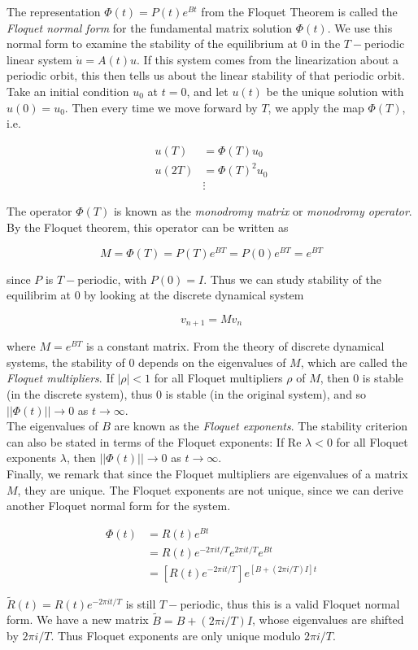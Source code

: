 \documentclass{article}
\begin{document}
The representation $\Phi(t) = P(t)e^{Bt}$ from the Floquet Theorem is called the \emph{Floquet normal form} for the fundamental matrix solution $\Phi(t)$. We use this normal form to examine the stability of the equilibrium at 0 in the $T-$periodic linear system $\dot{u} = A(t) u$. If this system comes from the linearization about a periodic orbit, this then tells us about the linear stability of that periodic orbit.\\

Take an initial condition $u_0$ at $t = 0$, and let $u(t)$ be the unique solution with $u(0) = u_0$. Then every time we move forward by $T$, we apply the map $\Phi(T)$, i.e.

\begin{align*}
u(T) &= \Phi(T) u_0 \\
u(2T) &= \Phi(T)^2 u_0 \\
&\vdots
\end{align*}

The operator $\Phi(T)$ is known as the \emph{monodromy matrix} or \emph{monodromy operator}. By the Floquet theorem, this operator can be written as

\[
M = \Phi(T) = P(T)e^{BT} = P(0) e^{BT} = e^{BT}
\]

since $P$ is $T-$periodic, with $P(0) = I$. Thus we can study stability of the equilibrim at 0 by looking at the discrete dynamical system

\[
v_{n+1} = M v_n
\]

where $M = e^{BT}$ is a constant matrix. From the theory of discrete dynamical systems, the stability of 0 depends on the eigenvalues of $M$, which are called the \emph{Floquet multipliers}. If $|\rho| < 1$ for all Floquet multipliers $\rho$ of $M$, then 0 is stable (in the discrete system), thus 0 is stable (in the original system), and so $||\Phi(t)|| \rightarrow 0$ as $t \rightarrow \infty$.\\

The eigenvalues of $B$ are known as the \emph{Floquet exponents}. The stability criterion can also be stated in terms of the Floquet exponents: If $\text{Re }\lambda < 0$ for all Floquet exponents $\lambda$, then $||\Phi(t)|| \rightarrow 0$ as $t \rightarrow \infty$.\\

Finally, we remark that since the Floquet multipliers are eigenvalues of a matrix $M$, they are unique. The Floquet exponents are not unique, since we can derive another Floquet normal form for the system.

\begin{align*}
\Phi(t) &= R(t) e^{Bt}  \\
&= R(t) e^{-2\pi i t/T}e^{2\pi i t/T}e^{Bt} \\
&= [ R(t) e^{-2\pi i t/T} ] e^{[B + (2 \pi i/T) I]t}
\end{align*}

$\tilde{R}(t) = R(t) e^{-2\pi i t/T}$ is still $T-$periodic, thus this is a valid Floquet normal form. We have a new matrix $\tilde{B} = B + (2 \pi i/T) I$, whose eigenvalues are shifted by $2 \pi i/T$. Thus Floquet exponents are only unique modulo $2 \pi i/T$.
\end{document}
